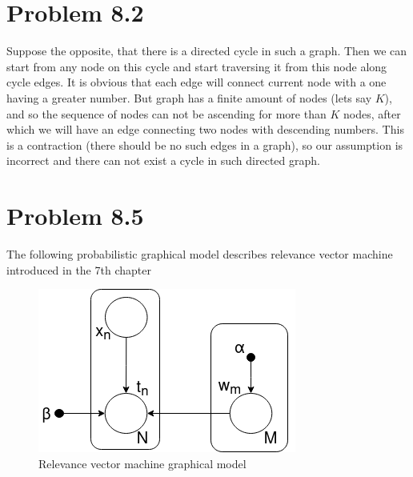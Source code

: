 \documentclass[fleqn]{article}
\begin{document}
\section*{Problem 8.2}

Suppose the opposite, that there is a directed cycle in such a graph. Then we can start from any node on this cycle and start traversing it from this node along cycle edges. It is obvious that each edge will connect current node with a one having a greater number. But graph has a finite amount of nodes (lets say $K$), and so the sequence of nodes can not be ascending for more than $K$ nodes, after which we will have an edge connecting two nodes with descending numbers. This is a contraction (there should be no such edges in a graph), so our assumption is incorrect and there can not exist a cycle in such directed graph. 

\section*{Problem 8.5}

The following probabilistic graphical model describes relevance vector machine introduced in the 7th chapter

\begin{figure}[h!]
	\centering
	\includegraphics[scale=0.5]{images/problem_8.5.png}
	\caption{Relevance vector machine graphical model}
	\label{fig:boat1}
\end{figure}
\end{document}
